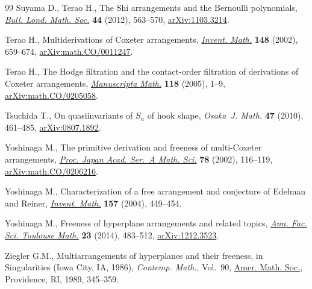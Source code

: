 \documentclass[10pt,a4paper]{amsart}
\numberwithin{equation}{section}
\begin{document}
\begin{thebibliography}{99}
Suyama D., Terao H., The {S}hi arrangements and the {B}ernoulli polynomials,
 \href{https://doi.org/10.1112/blms/bdr118}{\textit{Bull. Lond. Math. Soc.}} \textbf{44} (2012), 563--570,
 \href{https://arxiv.org/abs/1103.3214}{arXiv:1103.3214}.

Terao H., Multiderivations of {C}oxeter arrangements, \href{https://doi.org/10.1007/s002220100209}{\textit{Invent. Math.}}
 \textbf{148} (2002), 659--674, \href{https://arxiv.org/abs/math.CO/0011247}{arXiv:math.CO/0011247}.

Terao H., The {H}odge filtration and the contact-order filtration of
 derivations of {C}oxeter arrangements, \href{https://doi.org/10.1007/s00229-004-0536-z}{\textit{Manuscripta Math.}}
 \textbf{118} (2005), 1--9, \href{https://arxiv.org/abs/math.CO/0205058}{arXiv:math.CO/0205058}.

Tsuchida T., On quasiinvariants of {$S_n$} of hook shape, \textit{Osaka~J.
 Math.} \textbf{47} (2010), 461--485, \href{https://arxiv.org/abs/0807.1892}{arXiv:0807.1892}.

Yoshinaga M., The primitive derivation and freeness of multi-{C}oxeter
 arrangements, \href{https://doi.org/10.3792/pjaa.78.116}{\textit{Proc. Japan Acad. Ser.~A Math. Sci.}} \textbf{78}
 (2002), 116--119, \href{https://arxiv.org/abs/math.CO/0206216}{arXiv:math.CO/0206216}.

Yoshinaga M., Characterization of a free arrangement and conjecture of
 {E}delman and {R}einer, \href{https://doi.org/10.1007/s00222-004-0359-2}{\textit{Invent. Math.}} \textbf{157} (2004), 449--454.

Yoshinaga M., Freeness of hyperplane arrangements and related topics,
 \href{https://doi.org/10.5802/afst.1413}{\textit{Ann. Fac. Sci. Toulouse Math.}} \textbf{23} (2014), 483--512,
 \href{https://arxiv.org/abs/1212.3523}{arXiv:1212.3523}.

Ziegler G.M., Multiarrangements of hyperplanes and their freeness, in
 Singularities ({I}owa {C}ity, {IA}, 1986), \textit{Contemp. Math.}, Vol.~90,
 \href{https://doi.org/10.1090/conm/090/1000610}{Amer. Math. Soc.}, Providence, RI, 1989, 345--359.

\end{thebibliography}
\end{document}
